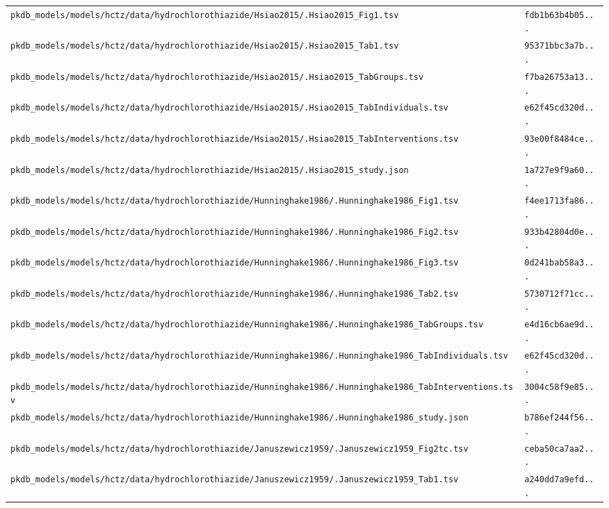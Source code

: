 \documentclass{article}
\begin{document}
\begin{longtable}{ll}
\texttt{pkdb\_models/models/hctz/data/hydrochlorothiazide/Hsiao2015/.Hsiao2015\_Fig1.tsv} & \texttt{fdb1b63b4b05...} \\
\texttt{pkdb\_models/models/hctz/data/hydrochlorothiazide/Hsiao2015/.Hsiao2015\_Tab1.tsv} & \texttt{95371bbc3a7b...} \\
\texttt{pkdb\_models/models/hctz/data/hydrochlorothiazide/Hsiao2015/.Hsiao2015\_TabGroups.tsv} & \texttt{f7ba26753a13...} \\
\texttt{pkdb\_models/models/hctz/data/hydrochlorothiazide/Hsiao2015/.Hsiao2015\_TabIndividuals.tsv} & \texttt{e62f45cd320d...} \\
\texttt{pkdb\_models/models/hctz/data/hydrochlorothiazide/Hsiao2015/.Hsiao2015\_TabInterventions.tsv} & \texttt{93e00f8484ce...} \\
\texttt{pkdb\_models/models/hctz/data/hydrochlorothiazide/Hsiao2015/.Hsiao2015\_study.json} & \texttt{1a727e9f9a60...} \\
\texttt{pkdb\_models/models/hctz/data/hydrochlorothiazide/Hunninghake1986/.Hunninghake1986\_Fig1.tsv} & \texttt{f4ee1713fa86...} \\
\texttt{pkdb\_models/models/hctz/data/hydrochlorothiazide/Hunninghake1986/.Hunninghake1986\_Fig2.tsv} & \texttt{933b42804d0e...} \\
\texttt{pkdb\_models/models/hctz/data/hydrochlorothiazide/Hunninghake1986/.Hunninghake1986\_Fig3.tsv} & \texttt{0d241bab58a3...} \\
\texttt{pkdb\_models/models/hctz/data/hydrochlorothiazide/Hunninghake1986/.Hunninghake1986\_Tab2.tsv} & \texttt{5730712f71cc...} \\
\texttt{pkdb\_models/models/hctz/data/hydrochlorothiazide/Hunninghake1986/.Hunninghake1986\_TabGroups.tsv} & \texttt{e4d16cb6ae9d...} \\
\texttt{pkdb\_models/models/hctz/data/hydrochlorothiazide/Hunninghake1986/.Hunninghake1986\_TabIndividuals.tsv} & \texttt{e62f45cd320d...} \\
\texttt{pkdb\_models/models/hctz/data/hydrochlorothiazide/Hunninghake1986/.Hunninghake1986\_TabInterventions.tsv} & \texttt{3004c58f9e85...} \\
\texttt{pkdb\_models/models/hctz/data/hydrochlorothiazide/Hunninghake1986/.Hunninghake1986\_study.json} & \texttt{b786ef244f56...} \\
\texttt{pkdb\_models/models/hctz/data/hydrochlorothiazide/Januszewicz1959/.Januszewicz1959\_Fig2tc.tsv} & \texttt{ceba50ca7aa2...} \\
\texttt{pkdb\_models/models/hctz/data/hydrochlorothiazide/Januszewicz1959/.Januszewicz1959\_Tab1.tsv} & \texttt{a240dd7a9efd...} \\

\end{longtable}
\end{document}
